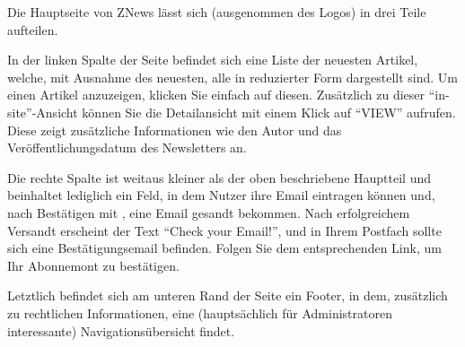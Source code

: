 Die Hauptseite von ZNews lässt sich
(ausgenommen des Logos)
in drei Teile aufteilen.

In der linken Spalte der Seite befindet sich eine Liste
der neuesten Artikel,
welche,
mit Ausnahme des neuesten,
alle in reduzierter Form dargestellt sind.
Um einen Artikel anzuzeigen,
klicken Sie einfach auf diesen.
Zusätzlich zu dieser ``in-site''-Ansicht
können Sie die Detailansicht mit einem Klick auf ``VIEW''
aufrufen.
Diese zeigt zusätzliche Informationen wie den Autor
und das Veröffentlichungsdatum des Newsletters an.

Die rechte Spalte ist weitaus kleiner als der oben beschriebene
Hauptteil und beinhaltet lediglich ein Feld,
in dem Nutzer ihre Email eintragen können und,
nach Bestätigen mit ,
eine Email gesandt bekommen.
Nach erfolgreichem Versandt erscheint der Text
``Check your Email!'',
und in Ihrem Postfach sollte sich eine Bestätigungsemail befinden.
Folgen Sie dem entsprechenden Link,
um Ihr Abonnemont zu bestätigen.

Letztlich befindet sich am unteren Rand der Seite ein Footer,
in dem,
zusätzlich zu rechtlichen Informationen,
eine (hauptsächlich für Administratoren interessante)
Navigationsübersicht findet.

